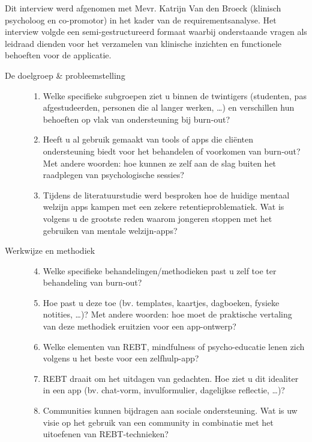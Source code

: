 \documentclass{hogent-article}
\begin{document}
    Dit interview werd afgenomen met Mevr. Katrijn Van den Broeck (klinisch psycholoog en co-promotor) in het kader van de requirementsanalyse. Het interview volgde een semi-gestructureerd formaat waarbij onderstaande vragen als leidraad dienden voor het verzamelen van klinische inzichten en functionele behoeften voor de applicatie.
    
    \vspace{1em}
    
    \begin{description}
        \item[De doelgroep \& probleemstelling] \hfill
        \begin{enumerate}
            \item Welke specifieke subgroepen ziet u binnen de twintigers (studenten, pas afgestudeerden, personen die al langer werken, \dots) en verschillen hun behoeften op vlak van ondersteuning bij burn-out?
            \item Heeft u al gebruik gemaakt van tools of apps die cliënten ondersteuning biedt voor het behandelen of voorkomen van burn-out? Met andere woorden: hoe kunnen ze zelf aan de slag buiten het raadplegen van psychologische sessies?
            \item Tijdens de literatuurstudie werd besproken hoe de huidige mentaal welzijn apps kampen met een zekere retentieproblematiek. Wat is volgens u de grootste reden waarom jongeren stoppen met het gebruiken van mentale welzijn-apps?
        \end{enumerate}
        
        \vspace{1em}
        
        \item[Werkwijze en methodiek] \hfill
        \begin{enumerate}
            \setcounter{enumi}{3}
            \item Welke specifieke behandelingen/methodieken past u zelf toe ter behandeling van burn-out?
            \item Hoe past u deze toe (bv. templates, kaartjes, dagboeken, fysieke notities, \dots)? Met andere woorden: hoe moet de praktische vertaling van deze methodiek eruitzien voor een app-ontwerp?
            \item Welke elementen van REBT, mindfulness of psycho-educatie lenen zich volgens u het beste voor een zelfhulp-app?
            \item REBT draait om het uitdagen van gedachten. Hoe ziet u dit idealiter in een app (bv. chat-vorm, invulformulier, dagelijkse reflectie, \dots)?
            \item Communities kunnen bijdragen aan sociale ondersteuning. Wat is uw visie op het gebruik van een community in combinatie met het uitoefenen van REBT-technieken?
        \end{enumerate}
        

\end{description}
\end{document}
